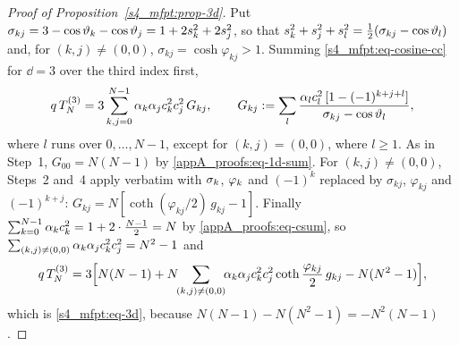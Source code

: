\begin{proof}[Proof of Proposition~\ref{s4_mfpt:prop-3d}]
Put $\sigma_{kj}=3-\cos\vartheta_{k}-\cos\vartheta_{j}=1+2s_{k}^{2}+2s_{j}^{2}$, so that
$s_{k}^{2}+s_{j}^{2}+s_{l}^{2}=\tfrac12(\sigma_{kj}-\cos\vartheta_{l})$ and, for $(k,j)\ne(0,0)$,
$\sigma_{kj}=\cosh\varphi_{kj}>1$. Summing \eqref{s4_mfpt:eq-cosine-cc} for $\dd=3$ over the third index first,
\begin{equation}\label{appA_proofs:eq-Gkj}
  q\,T_{N}^{(3)}=3\sum_{k,j=0}^{N-1}\alpha_{k}\alpha_{j}c_{k}^{2}c_{j}^{2}\,G_{kj},\qquad
  G_{kj}:=\sum_{l}\frac{\alpha_{l}c_{l}^{2}\,[1-(-1)^{k+j+l}]}{\sigma_{kj}-\cos\vartheta_{l}},
\end{equation}
where $l$ runs over $0,\dots,N-1$, except for $(k,j)=(0,0)$, where $l\ge1$. As in Step~1, $G_{00}=N(N-1)$ by
\eqref{appA_proofs:eq-1d-sum}. For $(k,j)\ne(0,0)$, Steps~2 and~4 apply verbatim with $\sigma_{k}$, $\varphi_{k}$ and
$(-1)^{k}$ replaced by $\sigma_{kj}$, $\varphi_{kj}$ and $(-1)^{k+j}$:
$G_{kj}=N[\coth(\varphi_{kj}/2)\,g_{kj}-1]$. Finally
$\sum_{k=0}^{N-1}\alpha_{k}c_{k}^{2}=1+2\cdot\frac{N-1}{2}=N$ by \eqref{appA_proofs:eq-csum}, so
$\sum_{(k,j)\ne(0,0)}\alpha_{k}\alpha_{j}c_{k}^{2}c_{j}^{2}=N^{2}-1$ and
\[
  q\,T_{N}^{(3)}=3\Bigl[N(N-1)+N\!\!\sum_{(k,j)\ne(0,0)}\!\!\alpha_{k}\alpha_{j}c_{k}^{2}c_{j}^{2}\coth\frac{\varphi_{kj}}{2}\,g_{kj}-N(N^{2}-1)\Bigr],
\]
which is \eqref{s4_mfpt:eq-3d}, because $N(N-1)-N(N^{2}-1)=-N^{2}(N-1)$.
\end{proof}
